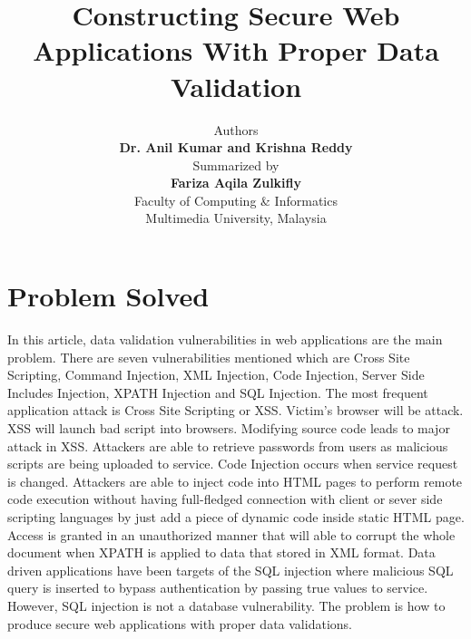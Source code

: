 \documentclass[a4paper,12pt]{article}
\begin{document}
\title{\textbf{Constructing Secure Web Applications With Proper Data Validation}}
\date{}
\author{
Authors\\
\textbf{Dr. Anil Kumar and Krishna Reddy}\\
Summarized by\\
\textbf{Fariza Aqila Zulkifly}\\
Faculty of Computing \& Informatics\\
Multimedia University, Malaysia}
\maketitle
\section{Problem Solved}
In this article, data validation vulnerabilities in web applications are the main problem. There are seven vulnerabilities mentioned which are Cross Site Scripting, Command Injection, XML Injection, Code Injection, Server Side Includes Injection, XPATH Injection and SQL Injection. The most frequent application attack is Cross Site Scripting or XSS. Victim’s browser will be attack. XSS will launch bad script into browsers. Modifying source code leads to major attack in XSS. Attackers are able to retrieve passwords from users as malicious scripts are being uploaded to service. Code Injection occurs when service request is changed. Attackers are able to inject code into HTML pages to perform remote code execution without having full-fledged connection with client or sever side scripting languages by just add a piece of dynamic code inside static HTML page. Access is granted in an unauthorized manner that will able to corrupt the whole document when XPATH is applied to data that stored in XML format. Data driven applications have been targets of the SQL injection where malicious SQL query is inserted to bypass authentication by passing true values to service. However, SQL injection is not a database vulnerability. The problem is how to produce secure web applications with proper data validations.
\end{document}
